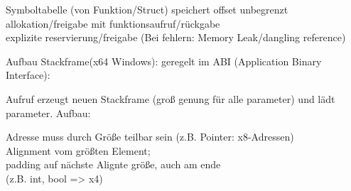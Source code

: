  Symboltabelle (von Funktion/Struct) speichert offset
 unbegrenzt\\
 allokation/freigabe mit funktionsaufruf/rückgabe\\
 explizite reservierung/freigabe (Bei fehlern: Memory Leak/dangling reference)

Aufbau Stackframe(x64 Windows): geregelt im ABI (Application Binary Interface):

Aufruf erzeugt neuen Stackframe (groß genung für alle parameter) und lädt parameter. Aufbau:

 
 Adresse muss durch Größe teilbar sein (z.B. Pointer: x8-Adressen)\\
 Alignment vom größten Element; \\padding auf nächste Alignte größe, auch am ende \\
(z.B. {int, bool} => x4) 

